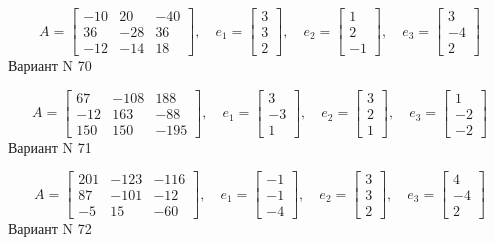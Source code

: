 \documentclass[11pt]{report}
\begin{document}
$$A = \left[\begin{matrix}-10 & 20 & -40\\36 & -28 & 36\\-12 & -14 & 18\end{matrix}\right],\quad e_1 = \left[\begin{matrix}3\\3\\2\end{matrix}\right],\quad e_2 = \left[\begin{matrix}1\\2\\-1\end{matrix}\right],\quad e_3 = \left[\begin{matrix}3\\-4\\2\end{matrix}\right]$$Вариант N 70

$$A = \left[\begin{matrix}67 & -108 & 188\\-12 & 163 & -88\\150 & 150 & -195\end{matrix}\right],\quad e_1 = \left[\begin{matrix}3\\-3\\1\end{matrix}\right],\quad e_2 = \left[\begin{matrix}3\\2\\1\end{matrix}\right],\quad e_3 = \left[\begin{matrix}1\\-2\\-2\end{matrix}\right]$$Вариант N 71

$$A = \left[\begin{matrix}201 & -123 & -116\\87 & -101 & -12\\-5 & 15 & -60\end{matrix}\right],\quad e_1 = \left[\begin{matrix}-1\\-1\\-4\end{matrix}\right],\quad e_2 = \left[\begin{matrix}3\\3\\2\end{matrix}\right],\quad e_3 = \left[\begin{matrix}4\\-4\\2\end{matrix}\right]$$Вариант N 72
\end{document}
